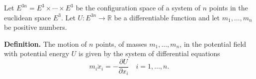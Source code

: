 Let $E^{3n} = E^3 \times \cdots \times E^3$ be the configuration space of a system of $n$ points in the euclidean space $E^3$. Let $U: E^{3n} \to \mathbb{R}$ be a differentiable function and let $m_1, \ldots, m_n$ be positive numbers.

\textbf{Definition.} The motion of $n$ points, of masses $m_1, \ldots, m_n$, in the potential field with potential energy $U$ is given by the system of differential equations
$$m_i \ddot{x}_i = -\frac{\partial U}{\partial x_i} \quad i = 1, \ldots, n.$$
